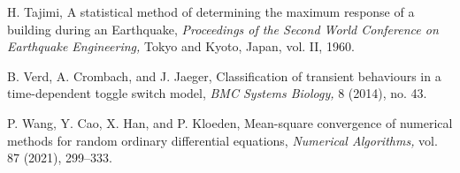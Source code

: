 \documentclass[reqno,12pt]{amsart}
\theoremstyle{plain} %
\theoremstyle{definition} %
\begin{document}
\begin{thebibliography}{25}
     H. Tajimi, A statistical method of determining the maximum response of a building during an Earthquake, \emph{Proceedings of the Second World Conference on Earthquake Engineering,} Tokyo and Kyoto, Japan, vol. II, 1960.
    
     B. Verd, A. Crombach, and J. Jaeger, Classification of transient behaviours in a time-dependent toggle switch model, \emph{BMC Systems Biology,} 8 (2014), no. 43.

     P. Wang, Y. Cao, X. Han, and P. Kloeden, Mean-square convergence of numerical methods for random ordinary differential equations, \emph{Numerical Algorithms,} vol. 87 (2021), 299--333.

\end{thebibliography}
\end{document}
